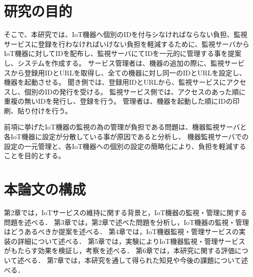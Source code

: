 \section{研究の目的}
そこで、本研究では、IoT機器へ個別のIDを付与シなければならない負担、監視サービスに登録を行わなければいけない負担を軽減するために、監視サーバからIoT機器に対してIDを配布し、監視サーバにてIDを一元的に管理する事を提案し、システムを作成する。
サービス管理者は、機器の追加の際に、監視サービスから登録用IDとURLを取得し、全ての機器に対し同一のIDとURLを設定し、機器を起動させる。
聞き側では、登録用IDとURLから、監視サービスにアクセスし、個別のIDの発行を受ける。
監視サービス側では、アクセスのあった順に重複の無いIDを発行し、登録を行う。
管理者は、機器を起動した順にIDの印刷、貼り付けを行う。

前項に挙げたIoT機器の監視の為の管理が負担である問題は、機器監視サーバと各IoT機器に設定が分散している事が原因であると分析し、
機器監視サーバでの設定の一元管理と、各IoT機器への個別の設定の簡略化により、負担を軽減することを目的とする。

\section{本論文の構成}
第2章では，IoTサービスの維持に関する背景と，IoT機器の監視・管理に関する問題を述べる．
第3章では，第2章で述べた問題を分析し，IoT機器の監視・管理はどうあるべきか提案を述べる．
第4章では，IoT機器監視・管理サービスの実装の詳細について述べる．
第5章では，実験によりIoT機器監視・管理サービスがもたらす効果を検証し，考察を述べる．
第6章では，本研究に関する評価について述べる．
第7章では，本研究を通して得られた知見や今後の課題について述べる．


